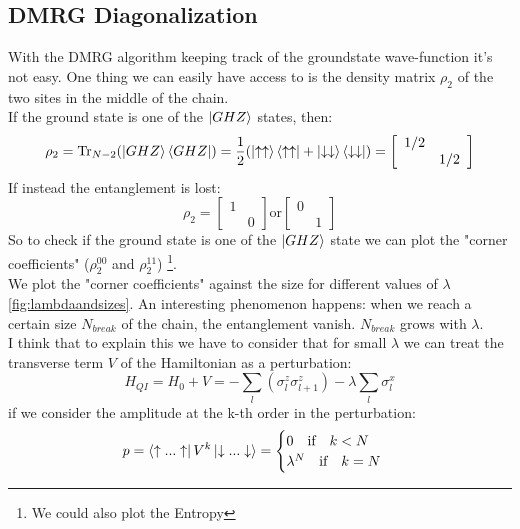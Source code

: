 \documentclass[12pt,a4paper]{article}
\begin{document}
\subsection{DMRG Diagonalization}
With the DMRG algorithm \cite{De_Chiara_2008} keeping track of the groundstate wave-function it's not easy. One thing we can easily have access to is the density matrix $\rho_2$ of the two sites in the middle of the chain.\\
If the ground state is one of the $\ket{GHZ}$ states, then:
\begin{equation}
	\rho_2=\Tr_{N-2}(\ket{GHZ}\bra{GHZ})=\frac{1}{{2}}(\ket{\uparrow\uparrow}\bra{\uparrow\uparrow}+\ket{\downarrow\downarrow}\bra{\downarrow\downarrow})=\left[\begin{array}{cc}
		1/2 &  \\
		& 1/2
	\end{array}\right]	
\end{equation}
If instead the entanglement is lost:
\begin{equation}
	\rho_2=\left[\begin{array}{cc}
		1 &  \\
		& 0
	\end{array}\right]	 \text{or} \left[\begin{array}{cc}
	0 &  \\
	& 1
\end{array}\right]
\end{equation}
So to check if the ground state is one of the $\ket{GHZ}$ state we  can plot the "corner  coefficients" ($\rho_2^{00}$ and $\rho_2^{11}$) \footnote{We could also  plot the Entropy}.\\ We plot the "corner coefficients" against the size for different values of $\lambda$  \ref{fig:lambdaandsizes}. 
An interesting phenomenon happens: when we reach a certain size $N_{break}$ of the chain, the entanglement vanish. $N_{break}$ grows with $\lambda$.\\
I think that to explain this we have to consider that for small $\lambda$  we can treat the transverse term $V$ of the Hamiltonian as a perturbation:
\begin{equation}\label{eq:perturb}
	H_{QI}=H_0+V=-\sum_{l}\left(\sigma_{l}^{z} \sigma_{l+1}^{z}\right) - \lambda \sum_l  \sigma_{l}^{x}
\end{equation}
if we consider the amplitude at the k-th order in the perturbation:
\begin{equation}
	p=\bra{\uparrow...\uparrow}V^k\ket{\downarrow...\downarrow}=\begin{cases}
		0 \quad \text{if} \quad k<N\\
		\lambda^N \quad \text{if} \quad k=N
	\end{cases}
\end{equation}
\end{document}
